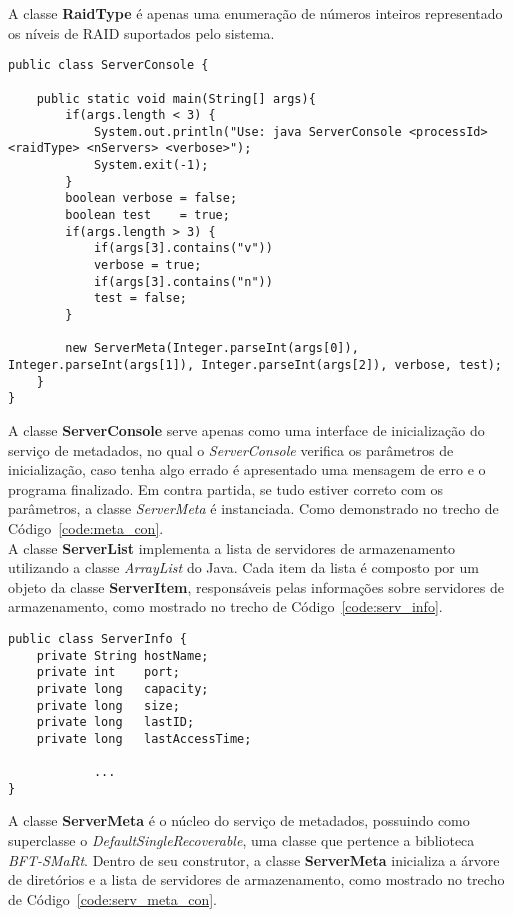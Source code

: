 A classe \textbf{RaidType} é apenas uma enumeração de números inteiros representado os níveis de RAID suportados pelo sistema.
\\

\begin{lstlisting}[basicstyle=\ttfamily\footnotesize, frame=single, caption=Classe ServerConsole, label=code:meta_con]	
public class ServerConsole {
	
	public static void main(String[] args){
		if(args.length < 3) {
			System.out.println("Use: java ServerConsole <processId> <raidType> <nServers> <verbose>");
			System.exit(-1);
		}
		boolean verbose = false;
		boolean test    = true;
		if(args.length > 3) {
			if(args[3].contains("v"))
			verbose = true;
			if(args[3].contains("n"))
			test = false;
		}
		
		new ServerMeta(Integer.parseInt(args[0]), Integer.parseInt(args[1]), Integer.parseInt(args[2]), verbose, test);
	}
}
\end{lstlisting}	

A classe \textbf{ServerConsole} serve apenas como uma interface de inicialização do serviço de metadados, no qual o \textit{ServerConsole} verifica os parâmetros de inicialização, caso tenha algo errado é apresentado uma mensagem de erro e o programa finalizado. Em contra partida, se tudo estiver correto com os parâmetros, a classe \textit{ServerMeta} é instanciada. Como demonstrado no trecho de Código~\ref{code:meta_con}.
\\

A classe \textbf{ServerList} implementa a lista de servidores de armazenamento utilizando a classe \textit{ArrayList} do Java. Cada item da lista é composto por um objeto da classe \textbf{ServerItem}, responsáveis pelas informações sobre servidores de armazenamento, como mostrado no trecho de Código~\ref{code:serv_info}.
\\

\begin{lstlisting}[basicstyle=\ttfamily\footnotesize, frame=single, caption=Campos da classe ServerInfo, label=code:serv_info]	
public class ServerInfo {
	private String hostName;
	private int    port;
	private long   capacity;
	private long   size;
	private long   lastID;
	private long   lastAccessTime;

			...
}
\end{lstlisting}	

A classe \textbf{ServerMeta} é o núcleo do serviço de metadados, possuindo como superclasse o \textit{DefaultSingleRecoverable}, uma classe que pertence a biblioteca \textit{BFT-SMaRt}. Dentro de seu construtor, a classe \textbf{ServerMeta} inicializa a árvore de diretórios e a lista de servidores de armazenamento, como mostrado no trecho de Código~\ref{code:serv_meta_con}.
\\

